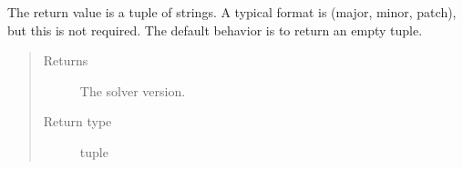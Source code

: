 \documentclass[letterpaper,10pt,english]{sphinxmanual}
\begin{document}
\begin{fulllineitems}
\begin{fulllineitems}
The return value is a tuple of strings.  A typical format is (major, minor, patch), but this
is not required. The default behavior is to return an empty tuple.
\begin{quote}\begin{description}
\item[{Returns}] \leavevmode
The solver version.

\item[{Return type}] \leavevmode
tuple

\end{description}\end{quote}

\end{fulllineitems}


\end{fulllineitems}

\end{document}
